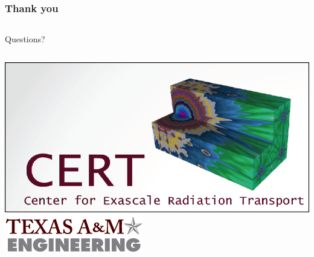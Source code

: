 \documentclass[compress,10pt]{beamer}
\newlength \figwidth
\begin{document}
\begin{frame}[plain]
   \frametitle{Thank you}

\vspace{25mm}

\begin{columns}[b]


\centering

{\Large Questions?}


\end{columns}

\vspace{10mm}

\begin{columns}[b]

\centering
{}\includegraphics[width=0.75\figwidth]{images/CERT_logo.png}\\

\centering
{}\includegraphics[width=0.70\figwidth]{images/tamu_engineering.png}\\

\end{columns}

\end{frame}
\end{document}
